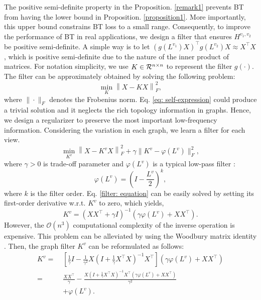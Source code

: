 \documentclass[letterpaper]{article} %
\begin{document}
The positive semi-definite property in the Proposition. \ref{remark1} prevents BT from having the lower bound in Proposition. \ref{proposition1}. More importantly, this upper bound constrains BT loss to a small range. 
Consequently, to improve the performance of BT in real applications, we design a filter that ensures $H^{v_1, v_2}$ be positive semi-definite. A simple way is to let $(g(L^{v_1})X)^{\top} g(L^{v_2}) X\approx X^{\top} X $, which is positive semi-definite due to the nature of the inner product of matrices. 
For notation simplicity, we use $K \in {\cal{R}}^{n\times n}$ to represent the filter $g(\cdot)$. The filter can be approximately obtained by solving the following problem:
\begin{equation}\label{eq: self-expression}
\min _{K}\left\|X- KX\right\|_F^2,
\end{equation}
where $\|\cdot\|_F$ denotes the Frobenius norm. Eq. \ref{eq: self-expression} could produce a trivial solution and it neglects the rich topology information in graphs. Hence, we design a regularizer to preserve the most important low-frequency information. Considering the variation in each graph, we learn a filter for each view. 
\begin{equation}\label{filter: equation}
\min _{K^v}\left\|{X} - K^v {X}\right\|_F^2+\gamma\|K^v -\varphi(L^v)\|_F^2,
\end{equation}
where $\gamma>0$ is trade-off parameter and $\varphi(L^v)$ is a typical low-pass filter \cite{zhang2019attributed}:
\begin{equation}
    \varphi(L^v) = (I - \frac{L^v}{2})^k,
\end{equation}
where $k$ is the filter order. Eq. \ref{filter: equation} can be easily solved by setting its first-order derivative w.r.t. $K^v$ to zero, which yields,
\begin{equation}\label{filter: solution1}
K^v = \left(X {X}^{\top}+\gamma I\right)^{-1}\left(\gamma \varphi(L^v)+X {X}^{\top}\right).
\end{equation}
However, the $\mathcal{O}\left(n^3\right)$ computational complexity of the inverse operation is expensive. This problem can be alleviated by using the Woodbury matrix identity \cite{higham2002accuracy}. 
Then, the graph filter $K^v$ can be reformulated as follows:
\begin{equation}\label{filter: solution2}
\begin{aligned}
K^v =\; & [\frac{1}{\gamma} I-\frac{1}{\gamma^2} X(I+\frac{1}{\gamma} {X}^{\top} {X})^{-1} {X}^{\top}]\left(\gamma \varphi(L^v) +{X} {X}^{\top}\right) \\
 =\; & \frac{X {X}^{\top}}{\gamma} -\frac{X (I+\frac{1}{\gamma} {X}^{\top} {X})^{-1}{X}^{\top}
\left(\gamma \varphi(L^v)+X{X}^{\top}\right)}{\gamma^2}\\
 \; & + \varphi(L^v).
\end{aligned}
\end{equation}
\end{document}
